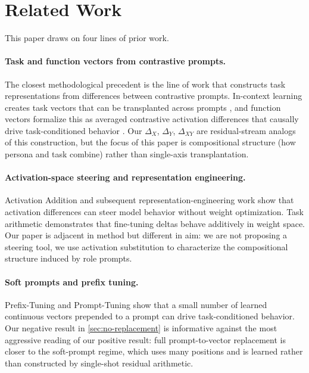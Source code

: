 \documentclass[11pt]{article}
\begin{document}
\section{Related Work}

This paper draws on four lines of prior work.

\paragraph{Task and function vectors from contrastive prompts.}
The closest methodological precedent is the line of work that constructs task representations from differences between contrastive prompts. In-context learning creates task vectors that can be transplanted across prompts \cite{hendel2023icltask}, and function vectors formalize this as averaged contrastive activation differences that causally drive task-conditioned behavior \cite{todd2024function}. Our $\Delta_X$, $\Delta_Y$, $\Delta_{XY}$ are residual-stream analogs of this construction, but the focus of this paper is compositional structure (how persona and task combine) rather than single-axis transplantation.

\paragraph{Activation-space steering and representation engineering.}
Activation Addition \cite{turner2023actadd} and subsequent representation-engineering work \cite{zou2023representation} show that activation differences can steer model behavior without weight optimization. Task arithmetic \cite{ilharco2023taskarith} demonstrates that fine-tuning deltas behave additively in weight space. Our paper is adjacent in method but different in aim: we are not proposing a steering tool, we use activation substitution to characterize the compositional structure induced by role prompts.

\paragraph{Soft prompts and prefix tuning.}
Prefix-Tuning \cite{li2021prefix} and Prompt-Tuning \cite{lester2021prompttuning} show that a small number of learned continuous vectors prepended to a prompt can drive task-conditioned behavior. Our negative result in \cref{sec:no-replacement} is informative against the most aggressive reading of our positive result: full prompt-to-vector replacement is closer to the soft-prompt regime, which uses many positions and is learned rather than constructed by single-shot residual arithmetic.
\end{document}
